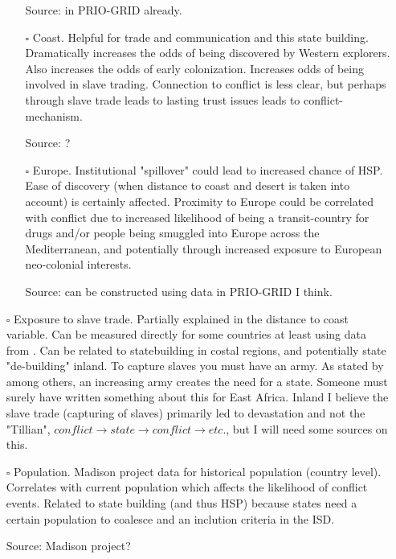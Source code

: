 \documentclass[12pt]{article}
\begin{document}
\begin{itemize}
\begin{itemize}
			Source: in PRIO-GRID already.

		\item[$\square$] Coast. Helpful for trade and communication and
			this state building. Dramatically increases the odds of
			being discovered by Western explorers. Also increases
			the odds of early colonization. Increases odds of being
			involved in slave trading. Connection to conflict is
			less clear, but perhaps through \citet{Nunn2008} slave
			trade leads to lasting trust issues leads to
			conflict-mechanism.

			Source: ?

		\item[$\square$] Europe. Institutional "spillover" could lead to
			increased chance of HSP. Ease of discovery (when
			distance to coast and desert is taken into account) is
			certainly affected. Proximity to Europe could be
			correlated with conflict due to increased likelihood of
			being a transit-country for drugs and/or people being
			smuggled into Europe across the Mediterranean, and
			potentially through increased exposure to European
			neo-colonial interests. 

			Source: can be constructed using data in PRIO-GRID I
			think.
	\end{itemize}

	\item[$\square$] Exposure to slave trade. Partially explained in the
		distance to coast variable. Can be measured directly for some
		countries at least using data from \citet{Nunn2008}. Can be
		related to statebuilding in costal regions, and potentially
		state "de-building" inland. To capture slaves you must have an
		army. As stated by \citet{Tilly1990} among others, an increasing
		army creates the need for a state. Someone must surely have
		written something about this for East Africa. Inland I believe
		the slave trade (capturing of slaves) primarily led to
		devastation and not the "Tillian", $conflict \rightarrow state
		\rightarrow conflict \rightarrow etc.$, but I will need some sources
		on this.

	\item[$\square$] Population. Madison project data for historical
		population (country level). Correlates with current population
		which affects the likelihood of conflict events. Related to
		state building (and thus HSP) because states need a certain
		population to coalesce and an inclution criteria in the ISD.
		
		Source: Madison project?


\end{itemize}
\end{document}

